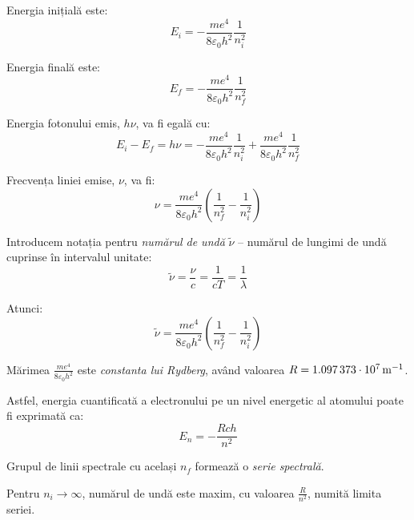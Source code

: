 Energia inițială este:
\[ E_i = -\frac{me^4}{8\varepsilon_0 h^2} \frac{1}{n_i^2} \]

Energia finală este:
\[ E_f = -\frac{me^4}{8\varepsilon_0 h^2} \frac{1}{n_f^2} \]

Energia fotonului emis, $h\nu$, va fi egală cu:
\[
    E_i - E_f = h\nu
    = -\frac{me^4}{8\varepsilon_0 h^2} \frac{1}{n_i^2}
    + \frac{me^4}{8\varepsilon_0 h^2} \frac{1}{n_f^2}
\]

Frecvența liniei emise, $\nu$, va fi:
\[
    \nu = \frac{me^4}{8\varepsilon_0 h^2}
    \left(\frac{1}{n_f^2} - \frac{1}{n_i^2}\right)
\]

Introducem notația pentru \emph{numărul de undă} $\tilde{\nu}$ -- numărul de
lungimi de undă cuprinse în intervalul unitate:
\[ \tilde{\nu} = \frac{\nu}{c} = \frac{1}{cT} = \frac{1}{\lambda} \]

Atunci:
\[
    \tilde{\nu} = \frac{me^4}{8\varepsilon_0 h^2}
    \left(\frac{1}{n_f^2} - \frac{1}{n_i^2}\right)
\]

Mărimea $\frac{me^4}{8\varepsilon_0 h^2}$ este \emph{constanta lui Rydberg}, având valoarea $R = \SI{1,097373d7}{\per\meter}$.

Astfel, energia cuantificată a electronului pe un nivel energetic al atomului
poate fi exprimată ca:
\[ E_n = -\frac{Rch}{n^2} \]

Grupul de linii spectrale cu același $n_f$ formează o \emph{serie spectrală}.

Pentru $n_i \rightarrow \infty$, numărul de undă este maxim, cu valoarea
$\frac{R}{n^2}$, numită limita seriei.
